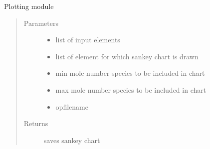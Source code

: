 \documentclass[letterpaper,10pt,english]{sphinxmanual}
\begin{document}
\begin{fulllineitems}
Plotting module
\begin{quote}\begin{description}
\item[{Parameters}] \leavevmode\begin{itemize}
\item {} 
 \textendash{} list of input elements

\item {} 
 \textendash{} list of element for which sankey chart is drawn

\item {} 
 \textendash{} min mole number species to be included in chart

\item {} 
 \textendash{} max mole number species to be included in chart

\item {} 
 \textendash{} opfilename

\end{itemize}

\item[{Returns}] \leavevmode
saves sankey chart

\end{description}\end{quote}

\end{fulllineitems}
\end{document}
